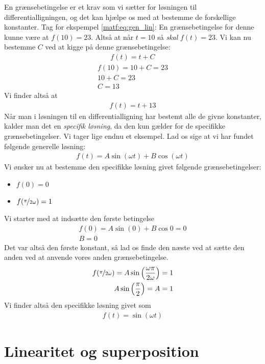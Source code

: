 \documentclass[crop=false, class=memoir]{standalone}
\begin{document}
En grænsebetingelse er et krav som vi sætter for løsningen til differentialligningen, og det kan hjælpe os med at bestemme de forskellige konstanter. Tag for ekspempel \cref{matf:eq:gen_lin}: En grænsebetingelse for denne kunne være at $f(10) = 23$. Altså at når $t = 10$ så \emph{skal} $f(t) = 23$. Vi kan nu bestemme $C$ ved at kigge på denne grænsebetingelse:
\begin{align}
    f(t) = t + C
\end{align}
\begin{align}
    f(10) = 10 + C = 23 \\
    10 + C = 23 \\
    C = 13
\end{align}
Vi finder altså at
\begin{align}
    f(t) = t + 13
\end{align}
Når man i løsningen til en differentialligning har bestemt alle de givne konstanter, kalder man det en \emph{specifik løsning}, da den kun gælder for de specifikke grænsebetingelser. Vi tager lige endnu et eksempel. Lad os sige at vi har fundet følgende generelle løsning:
\begin{align}
    f(t) = A\sin{(\omega t)} + B \cos{(\omega t)}
\end{align}
Vi ønsker nu at bestemme den specifikke løsning givet følgende grænsebetingelser:
\begin{itemize}
    \item   $f(0) = 0$
    \item   $f(\nicefrac{\pi}{2 \omega}) = 1$
\end{itemize}
Vi starter med at indsætte den første betingelse
\begin{align}
    f(0) = A \sin{(0)} + B \cos{0} = 0\\
    B = 0
\end{align}
Det var altså den første konstant, så lad os finde den næste ved at sætte den anden ved at anvende vores anden grænsebetingelse.
\begin{align}
    f(\nicefrac{\pi}{2 \omega}) = A \sin{\left( \frac{\omega \pi}{2 \omega}\right)} = 1\\
    A \sin{\left(\frac{\pi}{2}\right)} = A = 1
\end{align}
Vi finder altså den specifikke løsning givet som
\begin{align}
    f(t) = \sin{(\omega t)}
\end{align}

\section{Linearitet og superposition}
\end{document}
